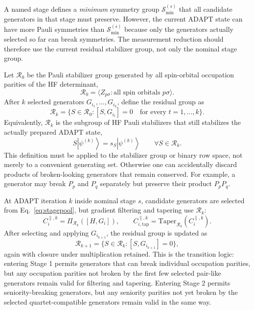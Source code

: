 \documentclass[11pt]{article}
\newcommand{\ket}[1]{\left|#1\right\rangle}
\newcommand{\minsym}{\mathcal S_{\min}^{(s)}}
\begin{document}
A named stage defines a \emph{minimum} symmetry group $\minsym$ that all candidate generators in that stage must preserve. However, the current ADAPT state can have more Pauli symmetries than $\minsym$ because only the generators actually selected so far can break symmetries. The measurement reduction should therefore use the current residual stabilizer group, not only the nominal stage group.

Let $\mathcal R_0$ be the Pauli stabilizer group generated by all spin-orbital occupation parities of the HF determinant,
\begin{equation}
    \mathcal R_0=\langle Z_{p\sigma}:\text{all spin orbitals }p\sigma\rangle .
\end{equation}
After $k$ selected generators $G_{i_1},\ldots,G_{i_k}$, define the residual group as
\begin{equation}
    \mathcal R_k
    =\{S\in\mathcal R_0:[S,G_{i_t}]=0\quad \text{for every }t=1,\ldots,k\}.
    \label{eq:residual-group}
\end{equation}
Equivalently, $\mathcal R_k$ is the subgroup of HF Pauli stabilizers that still stabilizes the actually prepared ADAPT state,
\begin{equation}
    S\ket{\psi^{(k)}}=s_S\ket{\psi^{(k)}}\qquad \forall S\in\mathcal R_k .
\end{equation}
This definition must be applied to the stabilizer group or binary row space, not merely to a convenient generating set. Otherwise one can accidentally discard products of broken-looking generators that remain conserved. For example, a generator may break $P_p$ and $P_q$ separately but preserve their product $P_pP_q$.

At ADAPT iteration $k$ inside nominal stage $s$, candidate generators are selected from Eq.~\eqref{eq:stagepool}, but gradient filtering and tapering use $\mathcal R_k$:
\begin{equation}
    C_i^{\parallel,k}=\Pi_{\mathcal R_k}([H,G_i]),
    \qquad
    C_{i,\mathrm{tap}}^{\parallel,k}
    =\mathrm{Taper}_{\mathcal R_k}(C_i^{\parallel,k}).
    \label{eq:residual-filter-taper}
\end{equation}
After selecting and applying $G_{i_{k+1}}$, the residual group is updated as
\begin{equation}
    \mathcal R_{k+1}
    =\{S\in\mathcal R_k:[S,G_{i_{k+1}}]=0\},
    \label{eq:residual-update}
\end{equation}
again with closure under multiplication retained. This is the transition logic: entering Stage 1 permits generators that can break individual occupation parities, but any occupation parities not broken by the first few selected pair-like generators remain valid for filtering and tapering. Entering Stage 2 permits seniority-breaking generators, but any seniority parities not yet broken by the selected quartet-compatible generators remain valid in the same way.
\end{document}
